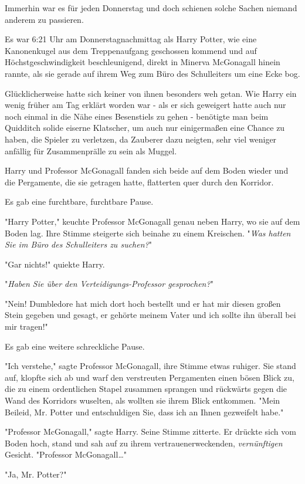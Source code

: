 {Immerhin war es für jeden Donnerstag und doch schienen solche Sachen niemand anderem zu passieren.

Es war 6:21 Uhr am Donnerstagnachmittag als Harry Potter, wie eine Kanonenkugel aus dem Treppenaufgang geschossen kommend und auf Höchstgeschwindigkeit beschleunigend, direkt in Minerva McGonagall hinein rannte, als sie gerade auf ihrem Weg zum Büro des Schulleiters um eine Ecke bog.

Glücklicherweise hatte sich keiner von ihnen besonders weh getan. Wie Harry ein wenig früher am Tag erklärt worden war - als er sich geweigert hatte auch nur noch einmal in die Nähe eines Besenstiels zu gehen - benötigte man beim Quidditch solide eiserne Klatscher, um auch nur einigermaßen eine Chance zu haben, die Spieler zu verletzen, da Zauberer dazu neigten, sehr viel weniger anfällig für Zusammenprälle zu sein als Muggel.

Harry und Professor McGonagall fanden sich beide auf dem Boden wieder und die Pergamente, die sie getragen hatte, flatterten quer durch den Korridor.

Es gab eine furchtbare, furchtbare Pause.

"Harry Potter," keuchte Professor McGonagall genau neben Harry, wo sie auf dem Boden lag. Ihre Stimme steigerte sich beinahe zu einem Kreischen. "\emph{Was hatten Sie im Büro des Schulleiters zu suchen?}"

"Gar nichts!" quiekte Harry.

"\emph{Haben Sie über den Verteidigungs-Professor gesprochen?}"

"Nein! Dumbledore hat mich dort hoch bestellt und er hat mir diesen großen Stein gegeben und gesagt, er gehörte meinem Vater und ich sollte ihn überall bei mir tragen!"

Es gab eine weitere schreckliche Pause.

"Ich verstehe," sagte Professor McGonagall, ihre Stimme etwas ruhiger. Sie stand auf, klopfte sich ab und warf den verstreuten Pergamenten einen bösen Blick zu, die zu einem ordentlichen Stapel zusammen sprangen und rückwärts gegen die Wand des Korridors wuselten, als wollten sie ihrem Blick entkommen. "Mein Beileid, Mr. Potter und entschuldigen Sie, dass ich an Ihnen gezweifelt habe."

"Professor McGonagall," sagte Harry. Seine Stimme zitterte. Er drückte sich vom Boden hoch, stand und sah auf zu ihrem vertrauenerweckenden, \emph{vernünftigen} Gesicht. "Professor McGonagall…"

"Ja, Mr. Potter?"

}
